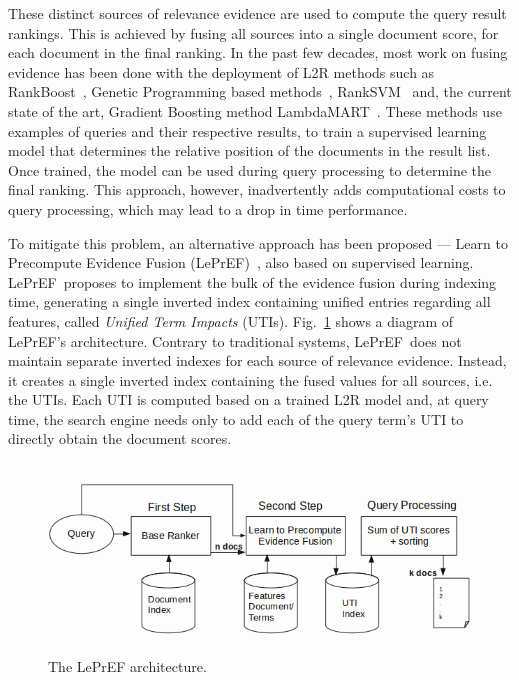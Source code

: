 \documentclass[preprint,12pt,3p]{elsarticle}
\begin{document}
These distinct sources of relevance evidence are used to compute the query result rankings. This is achieved by fusing all sources into a single document score, for each document in the final ranking. In the past few decades, most work on fusing evidence has been done with the deployment of L2R methods such as RankBoost~\cite{freund2003efficient}, Genetic Programming based methods~\cite{de2007combined, silva2009evolutionary}, RankSVM~\cite{joachims2002optimizing} and, the current state of the art, Gradient Boosting method LambdaMART~\cite{wu2010lambdamart}. These methods use examples of queries and their respective results, to train a supervised learning model that determines the relative position of the documents in the result list. Once trained, the model can be used during query processing to determine the final ranking. This approach, however, inadvertently adds computational costs to query processing, which may lead to a drop in time  performance.

\newcommand{\lepref}{LePrEF}

To mitigate this problem, an alternative approach has been proposed --- Learn to Precompute Evidence Fusion (\lepref)~\cite{costa2012lepref}, also based on supervised learning. \lepref\ proposes to implement the bulk of the evidence fusion during indexing time, generating a single inverted index containing unified entries regarding all features, called \textit{Unified Term Impacts} (UTIs). Fig.~\ref{fig:arq} shows a diagram of \lepref's architecture. Contrary to traditional systems, \lepref\ does not maintain separate inverted indexes for each source of relevance evidence. Instead, it creates a single inverted index containing the fused values for all sources, i.e. the UTIs. Each UTI is computed based on a trained L2R model and, at query time, the search engine needs only to add each of the query term's UTI to directly obtain the document scores.

\begin{figure}
\begin{center}
\includegraphics[width=12cm, height=5cm]{im_arquitetura.png}
\caption{The LePrEF architecture. }
\label{fig:arq}
\end{center}
\end{figure}
\end{document}

